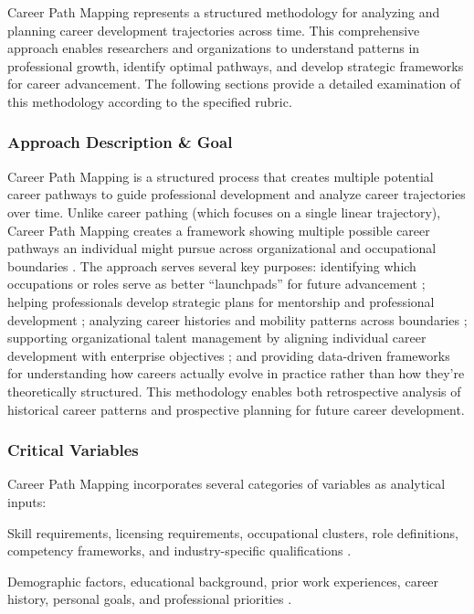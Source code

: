 \documentclass[../main.tex]{subfiles}
\begin{document}
Career Path Mapping represents a structured methodology for analyzing and planning career development trajectories across time. This comprehensive approach enables researchers and organizations to understand patterns in professional growth, identify optimal pathways, and develop strategic frameworks for career advancement. The following sections provide a detailed examination of this methodology according to the specified rubric.

\subsubsection{Approach Description \& Goal}

Career Path Mapping is a structured process that creates multiple potential career pathways to guide professional development and analyze career trajectories over time. Unlike career pathing (which focuses on a single linear trajectory), Career Path Mapping creates a framework showing multiple possible career pathways an individual might pursue across organizational and occupational boundaries \citep{chronus2023}. The approach serves several key purposes: identifying which occupations or roles serve as better ``launchpads'' for future advancement \citep{workforcegps2023}; helping professionals develop strategic plans for mentorship and professional development \citep{ncsu2023}; analyzing career histories and mobility patterns across boundaries \citep{joseph2012}; supporting organizational talent management by aligning individual career development with enterprise objectives \citep{chronus2023}; and providing data-driven frameworks for understanding how careers actually evolve in practice rather than how they're theoretically structured. This methodology enables both retrospective analysis of historical career patterns and prospective planning for future career development.

\subsubsection{Critical Variables}

Career Path Mapping incorporates several categories of variables as analytical inputs:

Skill requirements, licensing requirements, occupational clusters, role definitions, competency frameworks, and industry-specific qualifications \citep{workforcegps2023}.

Demographic factors, educational background, prior work experiences, career history, personal goals, and professional priorities \citep{workforcegps2023,hireed2021}.
\end{document}
